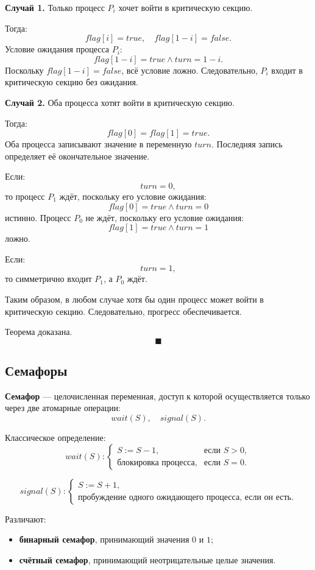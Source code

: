\documentclass[12pt,a4paper]{article}
\begin{document}
\textbf{Случай 1.} Только процесс $P_i$ хочет войти в критическую секцию.

Тогда:
\[
flag[i] = true,
\quad
flag[1-i] = false.
\]
Условие ожидания процесса $P_i$:
\[
flag[1-i] = true \land turn = 1-i.
\]
Поскольку $flag[1-i] = false$, всё условие ложно. Следовательно, $P_i$ входит в критическую секцию без ожидания.

\textbf{Случай 2.} Оба процесса хотят войти в критическую секцию.

Тогда:
\[
flag[0] = flag[1] = true.
\]
Оба процесса записывают значение в переменную $turn$. Последняя запись определяет её окончательное значение.

Если:
\[
turn = 0,
\]
то процесс $P_1$ ждёт, поскольку его условие ожидания:
\[
flag[0] = true \land turn = 0
\]
истинно. Процесс $P_0$ не ждёт, поскольку его условие ожидания:
\[
flag[1] = true \land turn = 1
\]
ложно.

Если:
\[
turn = 1,
\]
то симметрично входит $P_1$, а $P_0$ ждёт.

Таким образом, в любом случае хотя бы один процесс может войти в критическую секцию. Следовательно, прогресс обеспечивается.

Теорема доказана.
\[
\blacksquare
\]

\subsection{Семафоры}

\textbf{Семафор} --- целочисленная переменная, доступ к которой осуществляется только через две атомарные операции:
\[
wait(S), \quad signal(S).
\]

Классическое определение:
\[
wait(S):
\begin{cases}
S := S - 1, & \text{если } S > 0,\\
\text{блокировка процесса}, & \text{если } S = 0.
\end{cases}
\]

\[
signal(S):
\begin{cases}
S := S + 1,\\
\text{пробуждение одного ожидающего процесса, если он есть}.
\end{cases}
\]

Различают:
\begin{itemize}
    \item \textbf{бинарный семафор}, принимающий значения $0$ и $1$;
    \item \textbf{счётный семафор}, принимающий неотрицательные целые значения.
\end{itemize}
\end{document}
